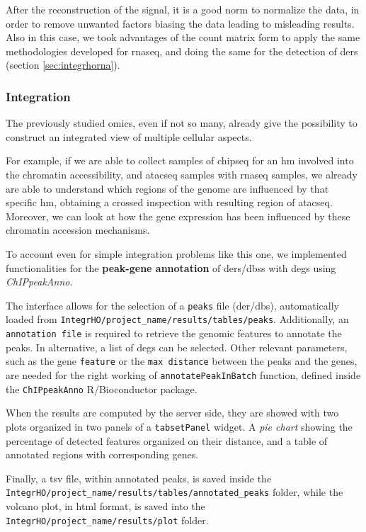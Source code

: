 After the reconstruction of the signal, it is a good norm to normalize the data, in order to remove unwanted factors biasing the data leading to misleading results.
Also in this case, we took advantages of the count matrix form to apply the same methodologies developed for \gls{rnaseq}, and doing the same for the detection of \glspl{der} (section \ref{sec:integrhorna}).

\subsubsection{Integration} \label{sec:integrhointegration}
The previously studied omics, even if not so many, already give the possibility to construct an integrated view of multiple cellular aspects.

For example, if we are able to collect samples of \gls{chipseq} for an \gls{hm} involved into the chromatin accessibility, and \gls{atacseq} samples with \gls{rnaseq} samples, we already are able to understand which regions of the genome are influenced by that  specific \gls{hm}, obtaining a crossed inspection with resulting region of \gls{atacseq}.
Moreover, we can look at how the gene expression has been influenced by these chromatin accession mechanisms.

To account even for simple integration problems like this one, we implemented functionalities for the \textbf{peak-gene annotation} of \glspl{der}/\glspl{dbs} with \glspl{deg} using \textit{ChIPpeakAnno}.

The interface allows for the selection of a \lstinline!peaks! file (\gls{der}/\gls{dbs}), automatically loaded from  \lstinline!IntegrHO/project_name/results/tables/peaks!.
Additionally, an \lstinline!annotation file! is required to retrieve the genomic features to annotate the peaks.
In alternative, a list of \glspl{deg} can be selected.
Other relevant parameters, such as the gene \lstinline!feature!  or the \lstinline!max distance! between the peaks and the genes, are needed for the right working of \lstinline!annotatePeakInBatch! function, defined inside the \lstinline!ChIPpeakAnno! R/Bioconductor package.

When the results are computed by the server side, they are showed with two plots organized in two panels of a \lstinline!tabsetPanel! widget. 
A \textit{pie chart} showing the percentage of detected features organized on their distance, and a table of annotated regions with corresponding genes.

Finally, a \gls{tsv} file, within annotated peaks, is saved inside the  \lstinline!IntegrHO/project_name/results/tables/annotated_peaks! folder, while the volcano plot, in \gls{html} format, is saved into the \lstinline!IntegrHO/project_name/results/plot! folder.

